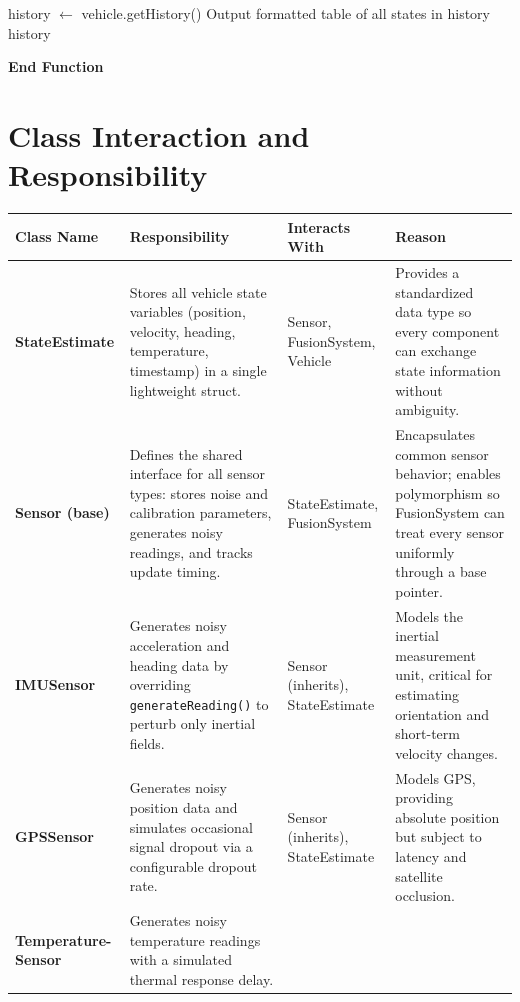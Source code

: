 \documentclass[a4paper,11pt]{article}
\begin{document}
\begin{algorithm}[H]
\begin{algorithmic}[1]
\vspace{0.15cm}
\State {}
\State history $\leftarrow$ vehicle.getHistory()
\State Output formatted table of all states in history
\State \Return history

\State \textbf{End Function}

\end{algorithmic}
\end{algorithm}

\section{Class Interaction and Responsibility}

\begin{table}[H]
\centering
\small
\renewcommand{\arraystretch}{1.4}
\begin{tabularx}{\textwidth}{>{\bfseries\ttfamily}p{2.2cm} X p{2.8cm} X}
\toprule
\textnormal{\textbf{Class Name}} & Responsibility & Interacts With & Reason \\
\midrule
StateEstimate &
Stores all vehicle state variables (position, velocity, heading, temperature, timestamp) in a single lightweight struct. &
Sensor, FusionSystem, Vehicle &
Provides a standardized data type so every component can exchange state information without ambiguity. \\
\addlinespace
Sensor \textnormal{(base)} &
Defines the shared interface for all sensor types: stores noise and calibration parameters, generates noisy readings, and tracks update timing. &
StateEstimate, FusionSystem &
Encapsulates common sensor behavior; enables polymorphism so FusionSystem can treat every sensor uniformly through a base pointer. \\
\addlinespace
IMUSensor &
Generates noisy acceleration and heading data by overriding \texttt{generateReading()} to perturb only inertial fields. &
Sensor (inherits), StateEstimate &
Models the inertial measurement unit, critical for estimating orientation and short-term velocity changes. \\
\addlinespace
GPSSensor &
Generates noisy position data and simulates occasional signal dropout via a configurable dropout rate. &
Sensor (inherits), StateEstimate &
Models GPS, providing absolute position but subject to latency and satellite occlusion. \\
\addlinespace
Temperature- Sensor &
Generates noisy temperature readings with a simulated thermal response delay. &

\end{tabularx}
\end{table}
\end{document}

